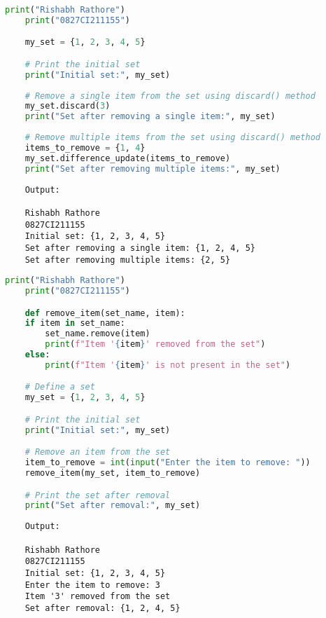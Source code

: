 \documentclass{report}
\begin{document}
\sol 
\begin{lstlisting}[language=Python]
	print("Rishabh Rathore")
	print("0827CI211155")

	my_set = {1, 2, 3, 4, 5}

	# Print the initial set
	print("Initial set:", my_set)
	
	# Remove a single item from the set using discard() method
	my_set.discard(3)
	print("Set after removing a single item:", my_set)
	
	# Remove multiple items from the set using discard() method
	items_to_remove = {1, 4}
	my_set.difference_update(items_to_remove)
	print("Set after removing multiple items:", my_set)
\end{lstlisting}

\begin{verbatim}
	Output:

	Rishabh Rathore
	0827CI211155
	Initial set: {1, 2, 3, 4, 5}
	Set after removing a single item: {1, 2, 4, 5}
	Set after removing multiple items: {2, 5}

\end{verbatim}


\newpage


\sol 
\begin{lstlisting}[language=Python]
	print("Rishabh Rathore")
	print("0827CI211155")

	def remove_item(set_name, item):
    if item in set_name:
        set_name.remove(item)
        print(f"Item '{item}' removed from the set")
    else:
        print(f"Item '{item}' is not present in the set")

	# Define a set
	my_set = {1, 2, 3, 4, 5}

	# Print the initial set
	print("Initial set:", my_set)

	# Remove an item from the set
	item_to_remove = int(input("Enter the item to remove: "))
	remove_item(my_set, item_to_remove)

	# Print the set after removal
	print("Set after removal:", my_set)
\end{lstlisting}

\begin{verbatim}
	Output:

	Rishabh Rathore
	0827CI211155
	Initial set: {1, 2, 3, 4, 5}
	Enter the item to remove: 3
	Item '3' removed from the set
	Set after removal: {1, 2, 4, 5}
	
	

\end{verbatim}
\end{document}
